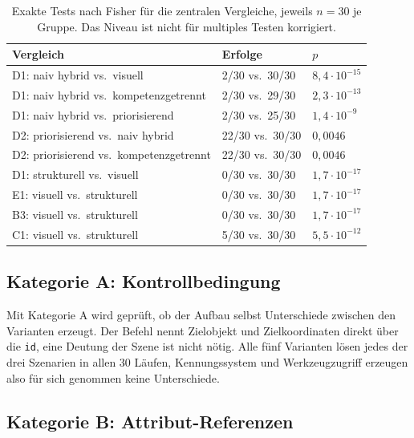 \begin{table}[ht]
  \centering
  \caption{Exakte Tests nach Fisher für die zentralen Vergleiche, jeweils
           $n=30$ je Gruppe. Das Niveau ist nicht für multiples Testen
           korrigiert.}
  \label{tab:fisher}
  \small
  \setlength{\tabcolsep}{5pt}
  \renewcommand{\arraystretch}{1.2}
  \begin{tabular}{@{}l l l@{}}
    \toprule
    Vergleich & Erfolge & $p$ \\
    \midrule
    D1: naiv hybrid vs.\ visuell            &  2/30 vs.\ 30/30 & $8{,}4\cdot10^{-15}$ \\
    D1: naiv hybrid vs.\ kompetenzgetrennt  &  2/30 vs.\ 29/30 & $2{,}3\cdot10^{-13}$ \\
    D1: naiv hybrid vs.\ priorisierend      &  2/30 vs.\ 25/30 & $1{,}4\cdot10^{-9}$ \\
    D2: priorisierend vs.\ naiv hybrid      & 22/30 vs.\ 30/30 & $0{,}0046$ \\
    D2: priorisierend vs.\ kompetenzgetrennt& 22/30 vs.\ 30/30 & $0{,}0046$ \\
    \addlinespace
    D1: strukturell vs.\ visuell            &  0/30 vs.\ 30/30 & $1{,}7\cdot10^{-17}$ \\
    E1: visuell vs.\ strukturell            &  0/30 vs.\ 30/30 & $1{,}7\cdot10^{-17}$ \\
    B3: visuell vs.\ strukturell            &  0/30 vs.\ 30/30 & $1{,}7\cdot10^{-17}$ \\
    C1: visuell vs.\ strukturell            &  5/30 vs.\ 30/30 & $5{,}5\cdot10^{-12}$ \\
    \bottomrule
  \end{tabular}
\end{table}

\subsection*{Kategorie A: Kontrollbedingung}

Mit Kategorie A wird geprüft, ob der Aufbau selbst Unterschiede zwischen den Varianten erzeugt.
Der Befehl nennt Zielobjekt und Zielkoordinaten direkt über die \texttt{id}, eine Deutung der Szene ist nicht nötig.
Alle fünf Varianten lösen jedes der drei Szenarien in allen 30 Läufen, Kennungssystem und Werkzeugzugriff erzeugen also für sich genommen keine Unterschiede.

\subsection*{Kategorie B: Attribut-Referenzen}

